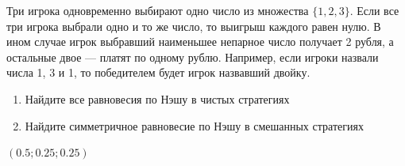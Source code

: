 \begin{problem}

Три игрока одновременно выбирают одно число из множества $\{1,2,3\}$. Если все три игрока выбрали одно и то же число, то выигрыш каждого равен нулю. В ином случае игрок выбравший наименьшее непарное число получает 2 рубля, а остальные двое --- платят по одному рублю. Например, если игроки назвали числа 1, 3 и 1, то победителем будет игрок назвавший двойку. \par
\begin{enumerate}
\item  Найдите все равновесия по Нэшу в чистых стратегиях \par
\item Найдите симметричное равновесие по Нэшу в смешанных стратегиях
\end{enumerate}


\begin{sol}
\item $(0.5;0.25;0.25)$
\end{sol}
\end{problem}


